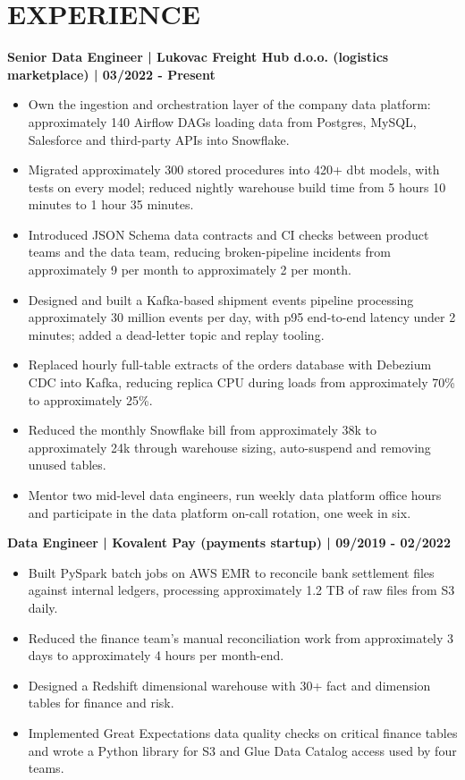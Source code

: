 \documentclass[11pt,a4paper]{article}
\begin{document}
\section*{EXPERIENCE}
\textbf{Senior Data Engineer | Lukovac Freight Hub d.o.o. (logistics marketplace) | 03/2022 - Present}
\begin{itemize}
\item Own the ingestion and orchestration layer of the company data platform: approximately 140 Airflow DAGs loading data from Postgres, MySQL, Salesforce and third-party APIs into Snowflake.
\item Migrated approximately 300 stored procedures into 420+ dbt models, with tests on every model; reduced nightly warehouse build time from 5 hours 10 minutes to 1 hour 35 minutes.
\item Introduced JSON Schema data contracts and CI checks between product teams and the data team, reducing broken-pipeline incidents from approximately 9 per month to approximately 2 per month.
\item Designed and built a Kafka-based shipment events pipeline processing approximately 30 million events per day, with p95 end-to-end latency under 2 minutes; added a dead-letter topic and replay tooling.
\item Replaced hourly full-table extracts of the orders database with Debezium CDC into Kafka, reducing replica CPU during loads from approximately 70\% to approximately 25\%.
\item Reduced the monthly Snowflake bill from approximately 38k to approximately 24k through warehouse sizing, auto-suspend and removing unused tables.
\item Mentor two mid-level data engineers, run weekly data platform office hours and participate in the data platform on-call rotation, one week in six.
\end{itemize}
\textbf{Data Engineer | Kovalent Pay (payments startup) | 09/2019 - 02/2022}
\begin{itemize}
\item Built PySpark batch jobs on AWS EMR to reconcile bank settlement files against internal ledgers, processing approximately 1.2 TB of raw files from S3 daily.
\item Reduced the finance team's manual reconciliation work from approximately 3 days to approximately 4 hours per month-end.
\item Designed a Redshift dimensional warehouse with 30+ fact and dimension tables for finance and risk.
\item Implemented Great Expectations data quality checks on critical finance tables and wrote a Python library for S3 and Glue Data Catalog access used by four teams.
\end{itemize}
\end{document}
